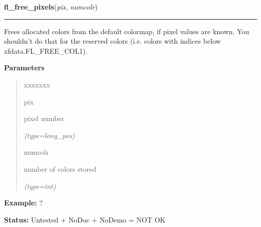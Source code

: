     \vspace{0.5ex}

\hspace{.8\funcindent}\begin{boxedminipage}{\funcwidth}

    \raggedright \textbf{fl\_free\_pixels}(\textit{pix}, \textit{numcolr})

    \vspace{-1.5ex}

    \rule{\textwidth}{0.5\fboxrule}
\setlength{\parskip}{2ex}
    Frees allocated colors from the default colormap, if pixel values are 
    known. You shouldn't do that for the reserved colors (i.e. colors with 
    indices below xfdata.FL\_FREE\_COL1).

\setlength{\parskip}{1ex}
      \textbf{Parameters}
      \vspace{-1ex}

      \begin{quote}
        \begin{Ventry}{xxxxxxx}

          \item[pix]

          pixel number

            {\it (type=long\_pos)}

          \item[numcolr]

          number of colors stored

            {\it (type=int)}

        \end{Ventry}

      \end{quote}

\textbf{Example:} ?



\textbf{Status:} Untested + NoDoc + NoDemo = NOT OK



    \end{boxedminipage}

    \label{xformslib:flbasic:fl_set_color_leak}

    \vspace{0.5ex}

